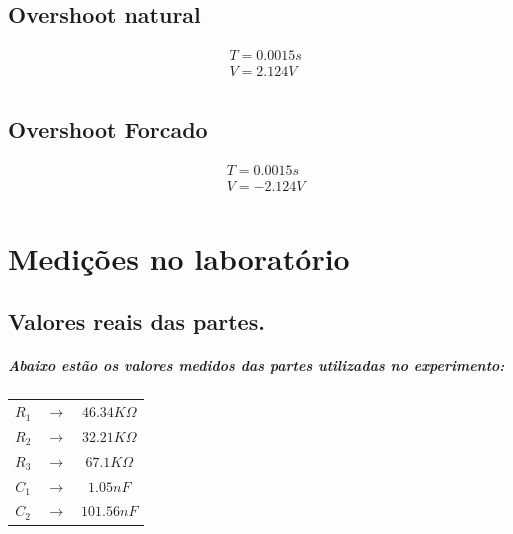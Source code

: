 \documentclass[12pt,twoside, a4paper, twocolumn]{article}
\begin{document}
\subsection{Overshoot natural}

\begin{equation*}
    \begin{aligned}
         & T = 0.0015s \\
         & V = 2.124V  \\
    \end{aligned}
\end{equation*}

\subsection{Overshoot Forcado}

\begin{equation*}
    \begin{aligned}
         & T = 0.0015s \\
         & V = -2.124V \\
    \end{aligned}
\end{equation*}

\newpage

\clearpage

\section{Medições no laboratório}

\subsection{Valores reais das partes.}
\subparagraph*{Abaixo estão os valores medidos das partes utilizadas no experimento:}

\begin{center}
    \begin{tabular}{ |ccc| }
        \hline
        $R_1$ & $\rightarrow$ & $46.34K\varOmega$ \\
        $R_2$ & $\rightarrow$ & $32.21K\varOmega$ \\
        $R_3$ & $\rightarrow$ & $67.1K\varOmega$  \\
        $C_1$ & $\rightarrow$ & $1.05nF$          \\
        $C_2$ & $\rightarrow$ & $101.56nF$        \\

        \hline
    \end{tabular}
\end{center}
\end{document}
